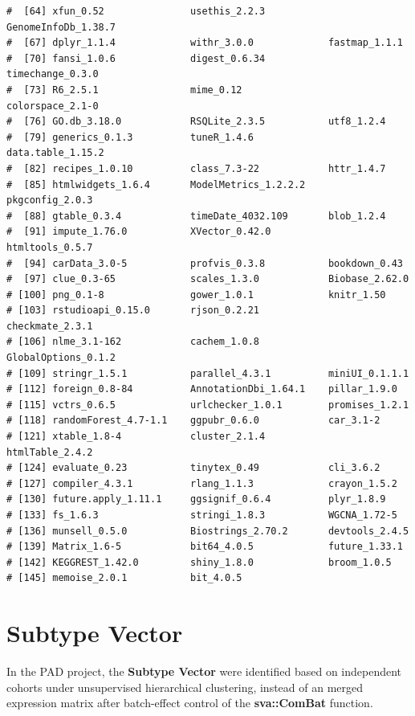 \documentclass[
  12pt,
]{book}
\begin{document}
\begin{lstlisting}
#  [64] xfun_0.52               usethis_2.2.3           GenomeInfoDb_1.38.7    
#  [67] dplyr_1.1.4             withr_3.0.0             fastmap_1.1.1          
#  [70] fansi_1.0.6             digest_0.6.34           timechange_0.3.0       
#  [73] R6_2.5.1                mime_0.12               colorspace_2.1-0       
#  [76] GO.db_3.18.0            RSQLite_2.3.5           utf8_1.2.4             
#  [79] generics_0.1.3          tuneR_1.4.6             data.table_1.15.2      
#  [82] recipes_1.0.10          class_7.3-22            httr_1.4.7             
#  [85] htmlwidgets_1.6.4       ModelMetrics_1.2.2.2    pkgconfig_2.0.3        
#  [88] gtable_0.3.4            timeDate_4032.109       blob_1.2.4             
#  [91] impute_1.76.0           XVector_0.42.0          htmltools_0.5.7        
#  [94] carData_3.0-5           profvis_0.3.8           bookdown_0.43          
#  [97] clue_0.3-65             scales_1.3.0            Biobase_2.62.0         
# [100] png_0.1-8               gower_1.0.1             knitr_1.50             
# [103] rstudioapi_0.15.0       rjson_0.2.21            checkmate_2.3.1        
# [106] nlme_3.1-162            cachem_1.0.8            GlobalOptions_0.1.2    
# [109] stringr_1.5.1           parallel_4.3.1          miniUI_0.1.1.1         
# [112] foreign_0.8-84          AnnotationDbi_1.64.1    pillar_1.9.0           
# [115] vctrs_0.6.5             urlchecker_1.0.1        promises_1.2.1         
# [118] randomForest_4.7-1.1    ggpubr_0.6.0            car_3.1-2              
# [121] xtable_1.8-4            cluster_2.1.4           htmlTable_2.4.2        
# [124] evaluate_0.23           tinytex_0.49            cli_3.6.2              
# [127] compiler_4.3.1          rlang_1.1.3             crayon_1.5.2           
# [130] future.apply_1.11.1     ggsignif_0.6.4          plyr_1.8.9             
# [133] fs_1.6.3                stringi_1.8.3           WGCNA_1.72-5           
# [136] munsell_0.5.0           Biostrings_2.70.2       devtools_2.4.5         
# [139] Matrix_1.6-5            bit64_4.0.5             future_1.33.1          
# [142] KEGGREST_1.42.0         shiny_1.8.0             broom_1.0.5            
# [145] memoise_2.0.1           bit_4.0.5
\end{lstlisting}

\hypertarget{subtype-vector}{%
\section{Subtype Vector}\label{subtype-vector}}

In the PAD project, the \textbf{Subtype Vector} were identified based on independent cohorts under unsupervised hierarchical clustering, instead of an merged expression matrix after batch-effect control of the \textbf{sva::ComBat} function.
\end{document}
